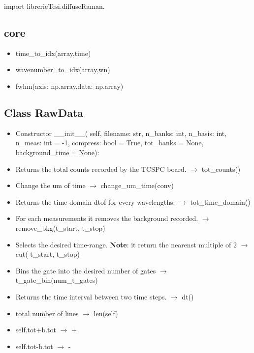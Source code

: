 \documentclass{article}
\begin{document}
import librerieTesi.diffuseRaman.

\subsection{core}

\begin{itemize}
\item time\_to\_idx(array,time)
\item wavenumber\_to\_idx(array,wn)
\item fwhm(axis: np.array,data: np.array)
\end{itemize}
\subsection{Class RawData}
\begin{itemize}
\item Constructor \_\_init\_\_(
            self,
            filename: str,
            n\_banks: int,
            n\_basis: int,
            n\_meas: int = -1,
            compress: bool = True,
            tot\_banks = None,
            background\_time = None):
\item Returns the total counts recorded by the TCSPC board. $\rightarrow$ tot\_counts()  
\item Change the um of time $\rightarrow$ change\_um\_time(conv)
\item  Returns the time-domain dtof for every wavelengths. $\rightarrow$ tot\_time\_domain()
\item  For each measurements it removes the background recorded. $\rightarrow$ remove\_bkg(t\_start, t\_stop)
\item Selects the desired time-range. \textbf{Note}: it return the nearenst multiple of 2 $\rightarrow$ cut( t\_start, t\_stop)
\item Bins the gate into the desired number of gates $\rightarrow$ t\_gate\_bin(num\_t\_gates)
\item Returns the time interval between two time steps. $\rightarrow$ dt()
\item total number of lines $\rightarrow$ len(self)
\item self.tot+b.tot $\rightarrow$ +
\item self.tot-b.tot $\rightarrow$ -
\end{itemize}
\end{document}
